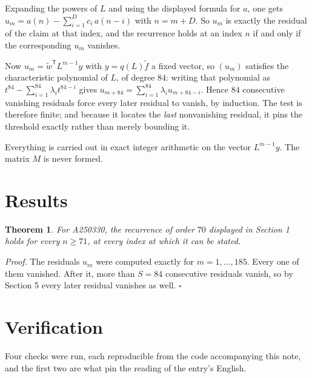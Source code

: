 \documentclass[11pt]{article}
\newtheorem{theorem}{Theorem}
\theoremstyle{definition}
\begin{document}
Expanding the powers of $L$ and using the displayed formula for $a$, one gets $u_m = a(n) - \sum_{i=1}^{D} c_i\,a(n-i)$ with $n = m + D$. So $u_m$ is exactly the residual of the claim at that index, and the recurrence holds at an index $n$ if and only if the corresponding $u_m$ vanishes.

Now $u_m = \tilde w^{\mathsf T} L^{m-1} y$ with $y = q(L)\tilde f$ a fixed vector, so $(u_m)$ satisfies the characteristic polynomial of $L$, of degree $84$: writing that polynomial as $t^{84} - \sum_{i=1}^{84} \lambda_i t^{84-i}$ gives $u_{m+84} = \sum_{i=1}^{84} \lambda_i u_{m+84-i}$. Hence $84$ consecutive vanishing residuals force every later residual to vanish, by induction. The test is therefore finite; and because it locates the {\itshape last} nonvanishing residual, it pins the threshold exactly rather than merely bounding it.

Everything is carried out in exact integer arithmetic on the vector $L^{m-1}y$. The matrix $M$ is never formed.

\section{Results}

\begin{theorem} For A250330, the recurrence of order $70$ displayed in Section 1 holds for every $n \ge 71$, at every index at which it can be stated.\end{theorem}

{\itshape Proof.} The residuals $u_m$ were computed exactly for $m = 1,\dots,185$. Every one of them vanished. After it, more than $S = 84$ consecutive residuals vanish, so by Section 5 every later residual vanishes as well. $\square$

\section{Verification}

Four checks were run, each reproducible from the code accompanying this note, and the first two are what pin the reading of the entry's English.
\end{document}
